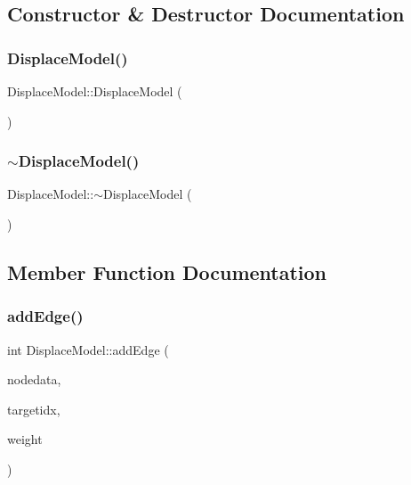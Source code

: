 \subsection{Constructor \& Destructor Documentation}
\mbox{\label{class_displace_model_af29ae4dea3e66ed8a83200e6314cb12e}} 
\subsubsection{\texorpdfstring{DisplaceModel()}{DisplaceModel()}}
{\footnotesize\ttfamily Displace\+Model\+::\+Displace\+Model (\begin{DoxyParamCaption}{ }\end{DoxyParamCaption})}

\mbox{\label{class_displace_model_a2fd27dbc798b2037cb2edffd46d5126a}} 
\subsubsection{\texorpdfstring{$\sim$DisplaceModel()}{~DisplaceModel()}}
{\footnotesize\ttfamily Displace\+Model\+::$\sim$\+Displace\+Model (\begin{DoxyParamCaption}{ }\end{DoxyParamCaption})}



\subsection{Member Function Documentation}
\mbox{\label{class_displace_model_a6afb3dffa06c671b14e46f59666abded}} 
\subsubsection{\texorpdfstring{addEdge()}{addEdge()}\hspace{0.1cm}{\footnotesize\ttfamily [1/2]}}
{\footnotesize\ttfamily int Displace\+Model\+::add\+Edge (\begin{DoxyParamCaption}\item[{std\+::shared\+\_\+ptr$<$ \mbox{\hyperlink{class_node_data}{Node\+Data}} $>$}]{nodedata,  }\item[{\mbox{\hyperlink{classtypes_1_1_node_id}{types\+::\+Node\+Id}}}]{targetidx,  }\item[{double}]{weight }\end{DoxyParamCaption})}



